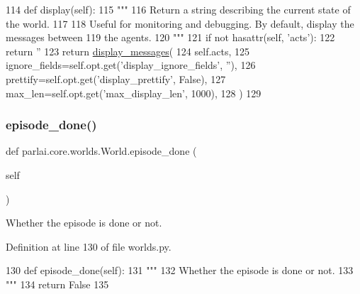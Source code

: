 \begin{DoxyCode}
114     \textcolor{keyword}{def }display(self):
115         \textcolor{stringliteral}{"""}
116 \textcolor{stringliteral}{        Return a string describing the current state of the world.}
117 \textcolor{stringliteral}{}
118 \textcolor{stringliteral}{        Useful for monitoring and debugging. By default, display the messages between}
119 \textcolor{stringliteral}{        the agents.}
120 \textcolor{stringliteral}{        """}
121         \textcolor{keywordflow}{if} \textcolor{keywordflow}{not} hasattr(self, \textcolor{stringliteral}{'acts'}):
122             \textcolor{keywordflow}{return} \textcolor{stringliteral}{''}
123         \textcolor{keywordflow}{return} \hyperlink{namespaceparlai_1_1utils_1_1misc_a7c86f996f4b55a960da46c1142a2c507}{display\_messages}(
124             self.acts,
125             ignore\_fields=self.opt.get(\textcolor{stringliteral}{'display\_ignore\_fields'}, \textcolor{stringliteral}{''}),
126             prettify=self.opt.get(\textcolor{stringliteral}{'display\_prettify'}, \textcolor{keyword}{False}),
127             max\_len=self.opt.get(\textcolor{stringliteral}{'max\_display\_len'}, 1000),
128         )
129 
\end{DoxyCode}
\mbox{\label{classparlai_1_1core_1_1worlds_1_1World_aaaef76f5bae4cdbe8f78241f8cd7c3a3}} 
\subsubsection{\texorpdfstring{episode\+\_\+done()}{episode\_done()}}
{\footnotesize\ttfamily def parlai.\+core.\+worlds.\+World.\+episode\+\_\+done (\begin{DoxyParamCaption}\item[{}]{self }\end{DoxyParamCaption})}

\begin{DoxyVerb}Whether the episode is done or not.
\end{DoxyVerb}
 

Definition at line 130 of file worlds.\+py.


\begin{DoxyCode}
130     \textcolor{keyword}{def }episode\_done(self):
131         \textcolor{stringliteral}{"""}
132 \textcolor{stringliteral}{        Whether the episode is done or not.}
133 \textcolor{stringliteral}{        """}
134         \textcolor{keywordflow}{return} \textcolor{keyword}{False}
135 
\end{DoxyCode}
\mbox{\label{classparlai_1_1core_1_1worlds_1_1World_aa8a3ab5345bbfa1d485dec974ed28b53}} 
